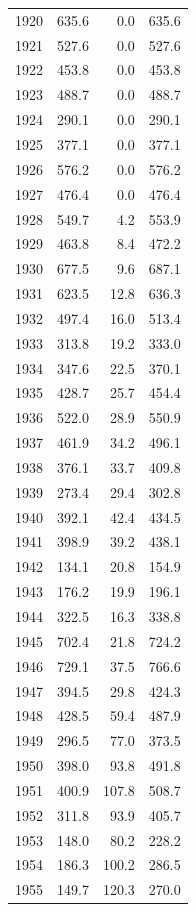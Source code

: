 \documentclass[12pt,]{article}
\begin{document}
\begin{longtable}{rrrr}
  1920 & 635.6 & 0.0 & 635.6 \\ 
  1921 & 527.6 & 0.0 & 527.6 \\ 
  1922 & 453.8 & 0.0 & 453.8 \\ 
  1923 & 488.7 & 0.0 & 488.7 \\ 
  1924 & 290.1 & 0.0 & 290.1 \\ 
  1925 & 377.1 & 0.0 & 377.1 \\ 
  1926 & 576.2 & 0.0 & 576.2 \\ 
  1927 & 476.4 & 0.0 & 476.4 \\ 
  1928 & 549.7 & 4.2 & 553.9 \\ 
  1929 & 463.8 & 8.4 & 472.2 \\ 
  1930 & 677.5 & 9.6 & 687.1 \\ 
  1931 & 623.5 & 12.8 & 636.3 \\ 
  1932 & 497.4 & 16.0 & 513.4 \\ 
  1933 & 313.8 & 19.2 & 333.0 \\ 
  1934 & 347.6 & 22.5 & 370.1 \\ 
  1935 & 428.7 & 25.7 & 454.4 \\ 
  1936 & 522.0 & 28.9 & 550.9 \\ 
  1937 & 461.9 & 34.2 & 496.1 \\ 
  1938 & 376.1 & 33.7 & 409.8 \\ 
  1939 & 273.4 & 29.4 & 302.8 \\ 
  1940 & 392.1 & 42.4 & 434.5 \\ 
  1941 & 398.9 & 39.2 & 438.1 \\ 
  1942 & 134.1 & 20.8 & 154.9 \\ 
  1943 & 176.2 & 19.9 & 196.1 \\ 
  1944 & 322.5 & 16.3 & 338.8 \\ 
  1945 & 702.4 & 21.8 & 724.2 \\ 
  1946 & 729.1 & 37.5 & 766.6 \\ 
  1947 & 394.5 & 29.8 & 424.3 \\ 
  1948 & 428.5 & 59.4 & 487.9 \\ 
  1949 & 296.5 & 77.0 & 373.5 \\ 
  1950 & 398.0 & 93.8 & 491.8 \\ 
  1951 & 400.9 & 107.8 & 508.7 \\ 
  1952 & 311.8 & 93.9 & 405.7 \\ 
  1953 & 148.0 & 80.2 & 228.2 \\ 
  1954 & 186.3 & 100.2 & 286.5 \\ 
  1955 & 149.7 & 120.3 & 270.0 \\ 

\end{longtable}
\end{document}
